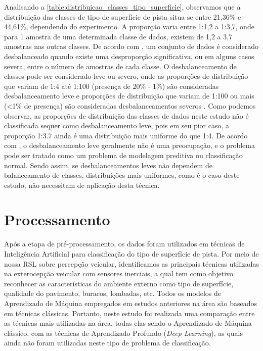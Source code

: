 Analisando a \autoref{table:distribuicao_classes_tipo_superficie}, observamos que a distribuição das classes de tipo de superfície de pista situa-se entre 21,36\% e 44,61\%, dependendo do experimento. A proporção varia entre 1:1,2 a 1:3,7, onde para 1 amostra de uma determinada classe de dados, existem de 1,2 a 3,7 amostras nas outras classes. De acordo com \cite{Fernandez2018}, um conjunto de dados é considerado desbalanceado quando existe uma desproporção significativa, ou em alguns casos severa, entre o número de amostras de cada classe. O desbalanceamento de classes pode ser considerado leve ou severo, onde as proporções de distribuição que variam de 1:4 até 1:100 (presença de 20\% - 1\%) são consideradas desbalanceamento leve e proporções de distribuição que variam de 1:100 ou mais (<1\% de presença) são consideradas desbalanceamentos severos \cite{Krawczyk2016,Brownlee2020}. Como podemos observar, as proporções de distribuição das classes de dados neste estudo não é classificada sequer como desbalanceamento leve, pois em seu pior caso, a proporção 1:3.7 ainda é uma distribuição mais uniforme do que 1:4. De acordo com \cite{Brownlee2020}, o desbalanceamento leve geralmente não é uma preocupação, e o problema pode ser tratado como um problema de modelagem preditiva ou classificação normal. Sendo assim, se desbalanceamentos leves não dependem de balanceamento de classes, distribuições mais uniformes, como é o caso deste estudo, não necessitam de aplicação desta técnica.

\section{Processamento}

Após a etapa de pré-processamento, os dados foram utilizados em técnicas de Inteligência Artificial para classificação do tipo de superfície de pista. Por meio de nossa RSL sobre percepção veicular, identificamos as principais técnicas utilizadas na exterocepção veicular com sensores inerciais, a qual tem como objetivo reconhecer as características do ambiente externo como tipo de superfície, qualidade do pavimento, buracos, lombadas, etc. Todos os modelos de Aprendizado de Máquina empregados em estudos anteriores na área são baseados em técnicas clássicas. Portanto, neste estudo foi realizada uma comparação entre as técnicas mais utilizadas na área, todas elas sendo o Aprendizado de Máquina clássico, com as técnicas de Aprendizado Profundo (\textit{Deep Learning}), as quais ainda não foram utilizadas neste tipo de problema de classificação.

